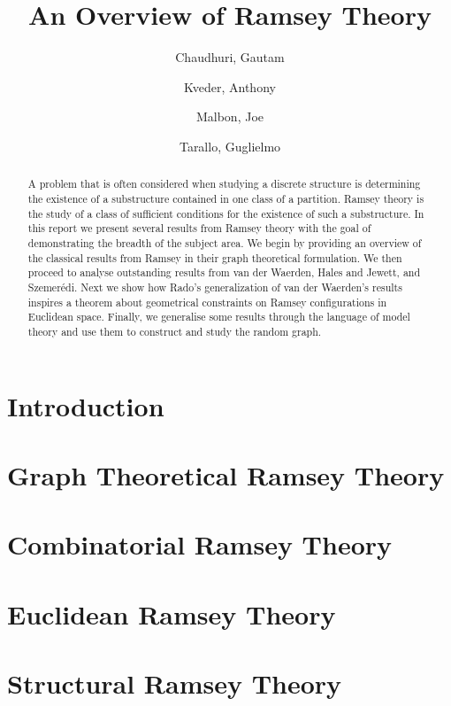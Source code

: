 \documentclass{article}
\title{An Overview of Ramsey Theory}
\author{
  Chaudhuri, Gautam\\
  \and
  Kveder, Anthony\\
  \and
  Malbon, Joe\\
  \and
  Tarallo, Guglielmo\\
}
\theoremstyle{BreakBold}
\theoremstyle{example}
\theoremstyle{definition}
\begin{document}
\begin{titlingpage}
\maketitle
\begin{abstract}
  A problem that is often considered when studying a discrete structure is
  determining the existence of a substructure contained in one class of a partition.
  Ramsey theory is the study of a class of sufficient conditions for the
  existence of such a substructure.
  In this report we present several results from Ramsey theory with the goal of
  demonstrating the breadth of the subject area.
  We begin by providing an overview of the classical results from Ramsey in
  their graph theoretical formulation.
  We then proceed to analyse outstanding results from van der Waerden, Hales
  and Jewett, and Szemerédi.
  Next we show how Rado's generalization of van der Waerden's results inspires 
  a theorem about geometrical constraints on Ramsey configurations in Euclidean space.
  Finally, we generalise some results through the language of model theory and
  use them to construct and study the random graph.
\end{abstract}
\tableofcontents
  
\end{titlingpage}

\section*{Introduction}
\label{sec:0}


\newpage
\section{Graph Theoretical Ramsey Theory}
\label{sec:1}


\newpage
\section{Combinatorial Ramsey Theory}
\label{sec:2}


\newpage
\section{Euclidean Ramsey Theory}
\label{sec:3}


\newpage
\section{Structural Ramsey Theory}
\label{sec:4}


\printbibliography
\end{document}
